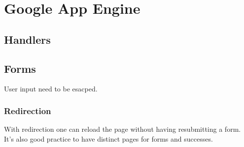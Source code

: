 \documentclass[12pt]{article}
\begin{document}
\section{Google App Engine}

\subsection{Handlers}



\subsection{Forms}



User input need to be esacped.



\subsubsection{Redirection}

With redirection one can reload the page without having resubmitting a form. It's also good practice to have distinct pages for forms and successes.






\printindex
\end{document}
